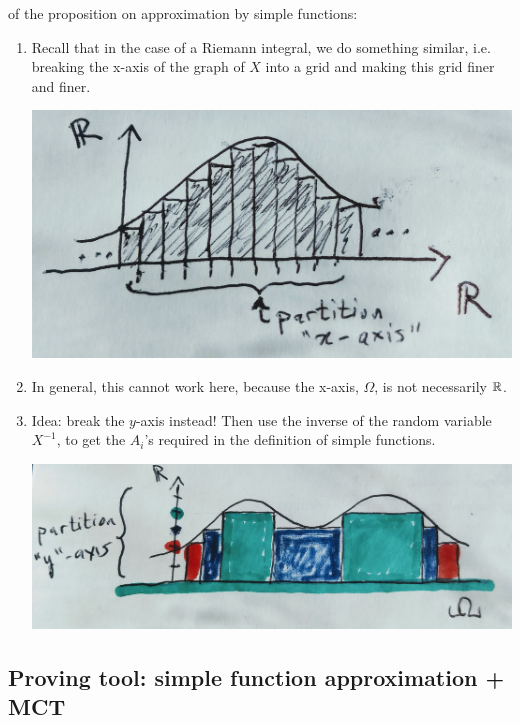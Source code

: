 \documentclass{article}
\begin{document}
 of the proposition on approximation by simple functions: 
\begin{enumerate}
  \item Recall that in the case of a Riemann integral, we do something similar, i.e. breaking the x-axis of the graph of $X$ into a grid and making this grid finer and finer.
  \begin{center}
  	\includegraphics[width=0.5\linewidth]{figures/riemann}
  \end{center}
  \item In general, this cannot work here, because the x-axis, $\Omega$, is not necessarily ${\mathbb R}$. 
  \item Idea: break the $y$-axis instead! Then use the inverse of the random variable $X^{-1}$, to get the $A_i$'s required in the definition of simple functions.
  \begin{center}
  	\includegraphics[width=0.7\linewidth]{figures/lebesgue}
  \end{center}
\end{enumerate}


\subsection{Proving tool: simple function approximation +  MCT}\label{sec:approxAndMCT}
\end{document}
